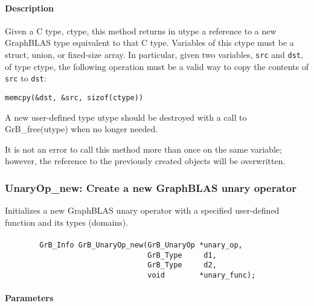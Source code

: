 \paragraph{Description}

Given a C type, {\sf ctype}, this method returns in {\sf utype} a reference to
a new GraphBLAS type equivalent to that C type.  Variables of this {\sf ctype} 
must be a struct, union, or fixed-size array. In particular, given two variables, 
{\tt src} and {\tt dst}, of type {\sf ctype}, the following operation must be a 
valid way to copy the contents of {\tt src} to {\tt dst}:

\begin{center}
{\tt memcpy(\&dst, \&src, sizof({\sf ctype}))}
\end{center}

A new user-defined type {\sf utype} should be destroyed with a call to 
{\sf GrB\_free(utype)} when no longer needed.

It is not an error to call this method more than once on the same variable;  
however, the reference to the previously created objects will be overwritten. 

\subsubsection{{\sf UnaryOp\_new}: Create a new GraphBLAS unary operator}

Initializes a new GraphBLAS unary operator with a specified user-defined 
function and its types (domains).

\paragraph{\syntax}

\begin{verbatim}
        GrB_Info GrB_UnaryOp_new(GrB_UnaryOp *unary_op,
                                 GrB_Type     d1,
                                 GrB_Type     d2,
                                 void        *unary_func);
\end{verbatim}

\paragraph{Parameters}

